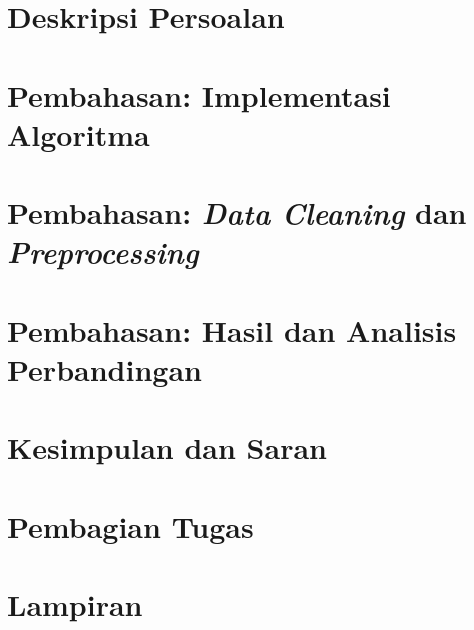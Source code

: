\documentclass[12pt,a4paper]{report}
\begin{document}
	\clearpage
	\pagestyle{fancy}

	\tableofcontents
	\clearpage
	\listoftables
	\clearpage
	\listoffigures
	\clearpage

	\chapter{Deskripsi Persoalan}
	

	\chapter{Pembahasan: Implementasi Algoritma}
	

	\chapter{Pembahasan: \textit{Data Cleaning} dan \textit{Preprocessing}}
	

	\chapter{Pembahasan: Hasil dan Analisis Perbandingan}
	

	\chapter{Kesimpulan dan Saran}
	

	\chapter{Pembagian Tugas}
	

	

	\appendix
	\chapter{Lampiran}
	
\end{document}
